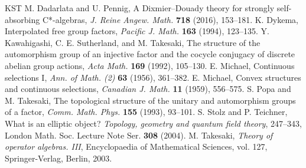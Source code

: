 \documentclass[12pt,nosumlimits,nonamelimits]{amsart}
\theoremstyle{remark}
\begin{document}
%
\begin{thebibliography}{KST}
%
%
 M. Dadarlata and U. Pennig, 
A Dixmier--Douady theory for strongly self-absorbing C*-algebras, 
\textit{J. Reine Angew. Math.} \textbf{718} (2016), 153--181. 
%
 K. Dykema, 
Interpolated free group factors, 
\textit{Pacific J. Math.} \textbf{163} (1994), 123--135.
%
 Y. Kawahigashi, C. E. Sutherland, and M. Takesaki,
The structure of the automorphism group of an injective factor 
and the cocycle conjugacy of discrete abelian group actions, 
\textit{Acta Math.} \textbf{169} (1992), 105--130.
%
 E. Michael, 
Continuous selections I, 
\textit{Ann. of Math. (2)} \textbf{63} (1956), 361--382.
%
 E. Michael, 
Convex structures and continuous selections, 
\textit{Canadian J. Math.} \textbf{11} (1959), 556--575.
%
 S. Popa and M. Takesaki, 
The topological structure of the unitary and automorphism groups of a factor, 
\textit{Comm. Math. Phys.} \textbf{155} (1993), 93--101. 
%
 S. Stolz and P. Teichner, 
What is an elliptic object? 
\textit{Topology, geometry and quantum field theory}, 247--343, 
London Math. Soc. Lecture Note Ser. \textbf{308} (2004).
%
 M. Takesaki, 
\textit{Theory of operator algebras. III}, 
Encyclopaedia of Mathematical Sciences, vol. 127, 
Springer-Verlag, Berlin, 2003.
%
\end{thebibliography}
\end{document}
